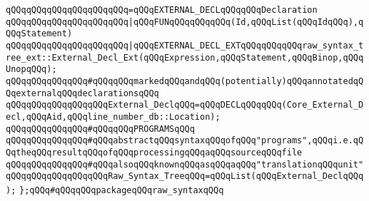 \verb|qQQqqQQqqQQqqQQqqQQqqQQq=qQQqEXTERNAL_DECLqQQqqQQqDeclaration|\newline
\verb|qQQqqQQqqQQqqQQqqQQqqQQq|\verb#|qQQqFUNqQQqqQQqqQQq(Id,qQQqList(qQQqIdqQQq),qQQqStatement)#\newline
\verb|qQQqqQQqqQQqqQQqqQQqqQQq|\verb#|qQQqEXTERNAL_DECL_EXTqQQqqQQqqQQqraw_syntax_tree_ext::External_Decl_Ext(qQQqExpression,qQQqStatement,qQQqBinop,qQQqUnopqQQq);#\newline
\newline
\verb|qQQqqQQqqQQqqQQq#qQQqqQQqmarkedqQQqandqQQq(potentially)qQQqannotatedqQQqexternalqQQqdeclarationsqQQq|\newline
\verb|qQQqqQQqqQQqqQQqqQQqExternal_DeclqQQq=qQQqDECLqQQqqQQq(Core_External_Decl,qQQqAid,qQQqline_number_db::Location);|\newline
\newline
\verb|qQQqqQQqqQQqqQQq#qQQqqQQqPROGRAMSqQQq|\newline
\verb|qQQqqQQqqQQqqQQq#qQQqabstractqQQqsyntaxqQQqofqQQq"programs",qQQqi.e.qQQqtheqQQqresultqQQqofqQQqprocessingqQQqaqQQqsourceqQQqfile|\newline
\verb|qQQqqQQqqQQqqQQq#qQQqalsoqQQqknownqQQqasqQQqaqQQq"translationqQQqunit"|\newline
\newline
\verb|qQQqqQQqqQQqqQQqqQQqRaw_Syntax_TreeqQQq=qQQqList(qQQqExternal_DeclqQQq);|\newline
\newline
\newline
\verb|};qQQq#qQQqqQQqpackageqQQqraw_syntaxqQQq|\newline
\newline

